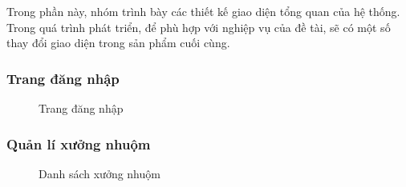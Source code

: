 Trong phần này, nhóm trình bày các thiết kế giao diện tổng quan của hệ thống. Trong quá trình phát triển, để phù hợp với nghiệp vụ của đề tài, sẽ có một số thay đổi giao diện trong sản phẩm cuối cùng.

\subsubsection{Trang đăng nhập}

\begin{figure}[H]
    \begin{center}
        \caption{Trang đăng nhập}
        \label{mockup_signin}
    \end{center}
\end{figure}

\subsubsection{Quản lí xưởng nhuộm}

\begin{figure}[H]
    \begin{center}
        \caption{Danh sách xưởng nhuộm}
        \label{mockup_homepage}
    \end{center}
\end{figure}

